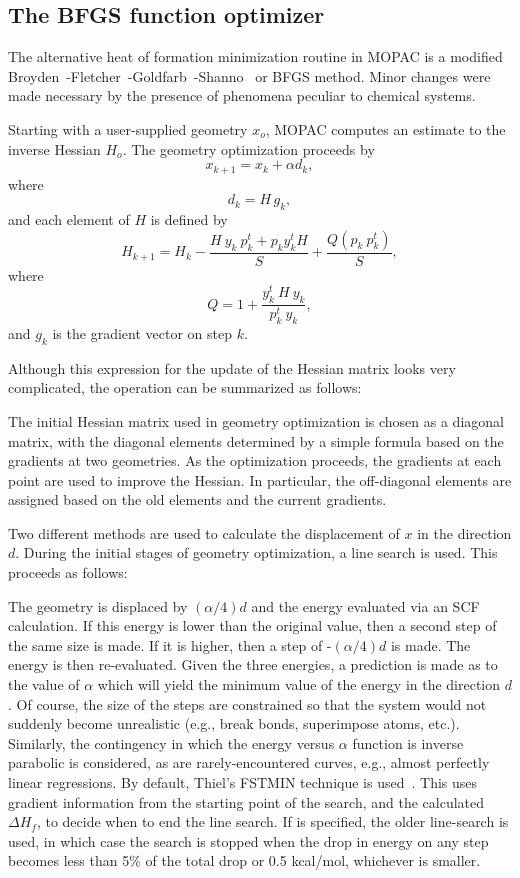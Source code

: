 \subsection{The BFGS function optimizer}
The alternative heat of formation minimization routine in  MOPAC is a modified 
Broyden~\cite{bfgs1}-Fletcher~\cite{bfgs2}-Goldfarb~\cite{bfgs3}-Shanno~\cite{bfgs4}
or BFGS method. Minor changes were made necessary by the presence of phenomena
peculiar to chemical systems.

Starting with a user-supplied geometry $x_o$, MOPAC computes an estimate to the
inverse Hessian $H_o$. The geometry optimization proceeds by
$$
x_{k+1} = x_k+\alpha d_k,
$$
where
$$
d_k=H\,g_k ,
$$
and each element of $H$ is defined by
$$
H_{k+1}=H_k-\frac{H\ y_k\ p_k^t + p_ky_k^tH}{S}+\frac{Q(p_k\ p_k^t)}{S},
$$
where  
$$
Q=1+\frac{y_k^t\ H\ y_k}{p_k^t\ y_k},
$$
and $g_k$ is the gradient vector on step $k$.

 Although this expression for the update of
the Hessian matrix looks very complicated, the operation can be summarized as
follows:

The initial Hessian matrix used in geometry optimization is chosen as a
diagonal matrix, with the diagonal elements determined by a simple formula
based on the gradients at two geometries.  As the optimization proceeds, the
gradients at each point are used to improve the Hessian.  In particular, the
off-diagonal elements are assigned based on the old elements and the current
gradients.

Two different methods are used to calculate the displacement of $x$ in the
direction $d$. During the initial stages of geometry optimization, a line
search is used. This proceeds as follows:

 The geometry is displaced by $(\alpha/4)d$
and the energy evaluated via an SCF calculation. If this energy is lower than
the original value, then a second step of the same size is made. If it is
higher, then a step of -$(\alpha/4)d$ is made. The energy is then re-evaluated.
Given the three energies, a prediction is made as to the value of $\alpha$
which will yield the  minimum  value  of the energy in the direction $d$. Of
course, the size of the steps are constrained so that the system would not
suddenly become unrealistic (e.g., break bonds, superimpose atoms, etc.).
Similarly, the contingency in which the energy versus $\alpha$ function is
inverse parabolic is considered, as are rarely-encountered curves, e.g., almost
perfectly linear regressions. By default, Thiel's FSTMIN  technique is used~\cite{fstmin}.  This uses gradient
information from the starting point of the search, and the calculated $\Delta
H_f$, to decide when to end the line search.  If  is specified,
the older line-search is used, in which case the search is stopped when the
drop in energy on any step becomes less than 5\% of the total drop or 0.5
kcal/mol, whichever is smaller.

